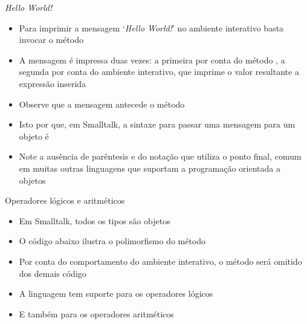 \begin{frame}[fragile]{\it Hello World!}

    \begin{itemize}
        \item Para imprimir a mensagem `\textit{Hello World!}' no ambiente interativo basta
            invocar o método 


        \item A mensagem é impressa duas vezes: a primeira por conta do método 
            , a segunda por conta do ambiente interativo, que imprime
            o valor resultante a expressão inserida

        \item Observe que a mensagem antecede o método

        \item Isto por que, em Smalltalk, a sintaxe para passar uma mensagem para um objeto é


        \item Note a ausência de parêntesis e do notação que utiliza o ponto final, comum em
            muitas outras linguagens que suportam a programação orientada a objetos
    \end{itemize}

\end{frame}

\begin{frame}[fragile]{Operadores lógicos e aritméticos}

    \begin{itemize}
        \item Em Smalltalk, todos os tipos são objetos

        \item O código abaixo ilustra o polimorfismo do método 


        \item Por conta do comportamento do ambiente interativo, o método 
            será omitido dos demais código

        \item A linguagem tem suporte para os operadores lógicos


        \item E também para os operadores aritméticos

    \end{itemize}

\end{frame}

